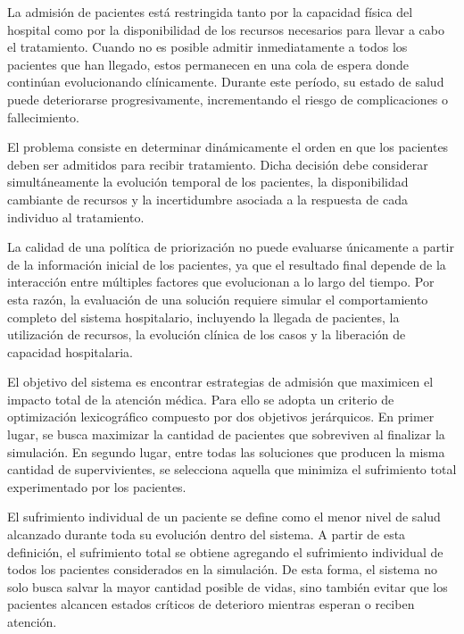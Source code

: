 \documentclass[12pt,a4paper]{article}
\begin{document}
La admisión de pacientes está restringida tanto por la capacidad física del hospital como por la disponibilidad de 
los recursos necesarios para llevar a cabo el tratamiento. 
Cuando no es posible admitir inmediatamente a todos los pacientes que han llegado, 
estos permanecen en una cola de espera donde continúan evolucionando clínicamente. 
Durante este período, su estado de salud puede deteriorarse progresivamente, incrementando el riesgo de complicaciones o 
fallecimiento.

El problema consiste en determinar dinámicamente el orden en que los pacientes deben ser admitidos para recibir tratamiento. 
Dicha decisión debe considerar simultáneamente la evolución temporal de los pacientes, 
la disponibilidad cambiante de recursos y la incertidumbre asociada a la respuesta de cada individuo al tratamiento.

La calidad de una política de priorización no puede evaluarse únicamente a partir de la información inicial de los pacientes, 
ya que el resultado final depende de la interacción entre múltiples factores que evolucionan a lo largo del tiempo. 
Por esta razón, la evaluación de una solución requiere simular el comportamiento completo del sistema hospitalario, 
incluyendo la llegada de pacientes, la utilización de recursos, la evolución clínica de los casos y 
la liberación de capacidad hospitalaria.

El objetivo del sistema es encontrar estrategias de admisión que maximicen el impacto total de la atención médica. 
Para ello se adopta un criterio de optimización lexicográfico compuesto por dos objetivos jerárquicos. 
En primer lugar, se busca maximizar la cantidad de pacientes que sobreviven al finalizar la simulación. 
En segundo lugar, entre todas las soluciones que producen la misma cantidad de supervivientes, 
se selecciona aquella que minimiza el sufrimiento total experimentado por los pacientes.

El sufrimiento individual de un paciente se define como el menor nivel de salud alcanzado durante toda su evolución 
dentro del sistema. 
A partir de esta definición, el sufrimiento total se obtiene agregando el sufrimiento individual de todos 
los pacientes considerados en la simulación. 
De esta forma, el sistema no solo busca salvar la mayor cantidad posible de vidas, 
sino también evitar que los pacientes alcancen estados críticos de deterioro mientras esperan o reciben atención.

\end{document}
